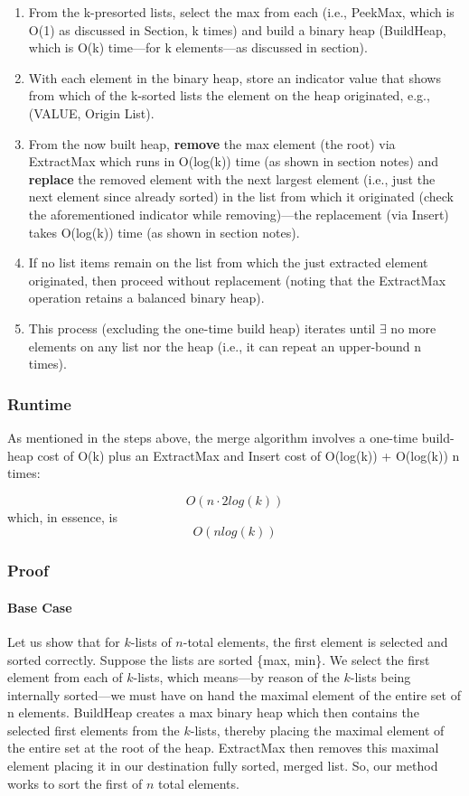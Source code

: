 \documentclass[conference]{styles/acmsiggraph}
\newcommand{\?}{\stackrel{?}{=}}
\newcommand\subsubsubsection{\paragraph}
\begin{document}
\begin{enumerate}
    \item From the k-presorted lists, select the max from each (i.e., PeekMax, which is O(1) as discussed in Section, k times) and build a binary heap (BuildHeap, which is O(k) time---for k elements---as discussed in section).
    \item With each element in the binary heap, store an indicator value that shows from which of the k-sorted lists the element on the heap originated, e.g., (VALUE, Origin List).
    \item From the now built heap, \textbf{remove} the max element (the root) via ExtractMax which runs in O(log(k)) time (as shown in section notes) and \textbf{replace} the removed element with the next largest element (i.e., just the next element since already sorted) in the list from which it originated (check the aforementioned indicator while removing)---the replacement (via Insert) takes O(log(k)) time (as shown in section notes).
    \item If no list items remain on the list from which the just extracted element originated, then proceed without replacement (noting that the ExtractMax operation retains a balanced binary heap).
    \item This process (excluding the one-time build heap) iterates until $\exists$ no more elements on any list nor the heap (i.e., it can repeat an upper-bound n times).
\end{enumerate}

\subsubsection{Runtime}
As mentioned in the steps above, the merge algorithm involves a one-time build-heap cost of O(k) plus an ExtractMax and Insert cost of O(log(k)) + O(log(k)) n times:

$$O(n \cdot 2log(k))$$ 
which, in essence, is 
$$O(nlog(k))$$

\subsubsection{Proof}
\subsubsubsection{Base Case}
Let us show that for $k$-lists of $n$-total elements, the first element is selected and sorted correctly.  Suppose the lists are sorted \{max, min\}.  We select the first element from each of $k$-lists, which means---by reason of the $k$-lists being internally sorted---we must have on hand the maximal element of the entire set of n elements.  BuildHeap creates a max binary heap which then contains the selected first elements from the $k$-lists, thereby placing the maximal element of the entire set at the root of the heap.  ExtractMax then removes this maximal element placing it in our destination fully sorted, merged list.  So, our method works to sort the first of $n$ total elements.
\end{document}
